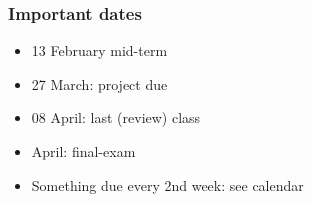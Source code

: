 \begin{frame}\frametitle{Important dates}
	\begin{itemize}
		\item	13 February mid-term  %
		\item	27 March: project due 
		\item	08 April: last (review) class
		\item	April: final-exam 
	\end{itemize}
	\begin{itemize}
		\item	Something due every 2nd week: see calendar
	\end{itemize}
\end{frame}

